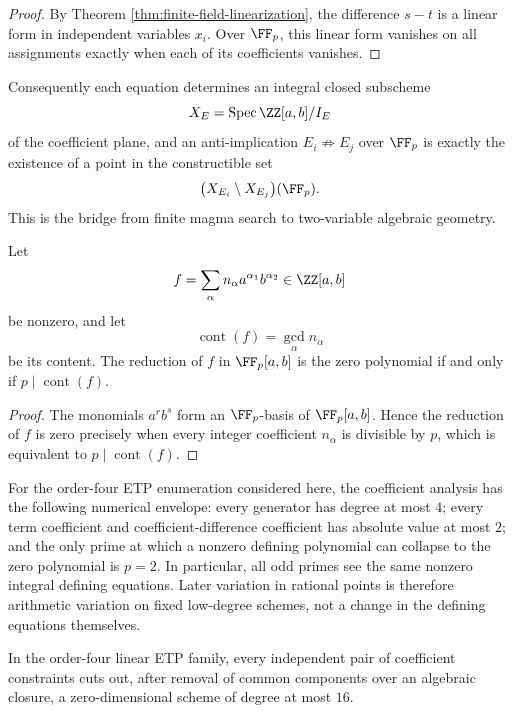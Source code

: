 \begin{proof}
By Theorem \ref{thm:finite-field-linearization}, the difference \(s-t\) is a
linear form in independent variables \(x_i\).  Over \(\FF_p\), this linear form
vanishes on all assignments exactly when each of its coefficients vanishes.
\end{proof}

Consequently each equation determines an integral closed subscheme
\[
    X_E=\operatorname{Spec}\ZZ[a,b]/I_E
\]
of the coefficient plane, and an anti-implication \(E_i\not\Rightarrow E_j\)
over \(\FF_p\) is exactly the existence of a point in the constructible set
\[
    \bigl(X_{E_i}\setminus X_{E_j}\bigr)(\FF_p).
\]
This is the bridge from finite magma search to two-variable algebraic
geometry.

\begin{theorem}\label{thm:finite-field-content-bound}
Let
\[
    f=\sum_{\alpha} n_\alpha a^{\alpha_1}b^{\alpha_2}\in\ZZ[a,b]
\]
be nonzero, and let
\[
    \operatorname{cont}(f)=\gcd_{\alpha} n_\alpha
\]
be its content.  The reduction of \(f\) in \(\FF_p[a,b]\) is the zero
polynomial if and only if \(p\mid \operatorname{cont}(f)\).
\end{theorem}

\begin{proof}
The monomials \(a^r b^s\) form an \(\FF_p\)-basis of \(\FF_p[a,b]\).  Hence the
reduction of \(f\) is zero precisely when every integer coefficient
\(n_\alpha\) is divisible by \(p\), which is equivalent to
\(p\mid\operatorname{cont}(f)\).
\end{proof}

For the order-four ETP enumeration considered here, the coefficient analysis
has the following numerical envelope: every generator has degree at most \(4\);
every term coefficient and coefficient-difference coefficient has absolute
value at most \(2\); and the only prime at which a nonzero defining polynomial
can collapse to the zero polynomial is \(p=2\).  In particular, all odd primes
see the same nonzero integral defining equations.  Later variation in rational
points is therefore arithmetic variation on fixed low-degree schemes, not a
change in the defining equations themselves.

\begin{lemma}\label{lem:finite-field-geometric-control}
In the order-four linear ETP family, every independent pair of coefficient
constraints cuts out, after removal of common components over an algebraic
closure, a zero-dimensional scheme of degree at most \(16\).
\end{lemma}

